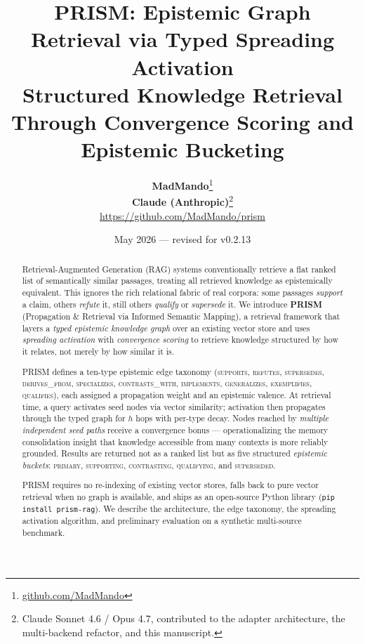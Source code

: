 \documentclass[11pt,a4paper]{article}
\title{
  \textbf{PRISM: Epistemic Graph Retrieval via Typed Spreading Activation} \\[0.5em]
  \large Structured Knowledge Retrieval Through Convergence Scoring and Epistemic Bucketing
}
\author{
  \textbf{MadMando}\thanks{\href{https://github.com/MadMando}{github.com/MadMando}} \\
  \textbf{Claude (Anthropic)}\thanks{Claude Sonnet 4.6 / Opus 4.7, contributed to the adapter architecture, the multi-backend refactor, and this manuscript.} \\[0.5em]
  \href{https://github.com/MadMando/prism}{https://github.com/MadMando/prism}
}
\date{May 2026 — revised for v0.2.13}
\begin{document}
\maketitle


\begin{abstract}
Retrieval-Augmented Generation (RAG) systems conventionally retrieve a flat ranked
list of semantically similar passages, treating all retrieved knowledge as
epistemically equivalent. This ignores the rich relational fabric of real corpora:
some passages \emph{support} a claim, others \emph{refute} it, still others
\emph{qualify} or \emph{supersede} it. We introduce \textbf{PRISM}
(Propagation \& Retrieval via Informed Semantic Mapping), a retrieval framework
that layers a \emph{typed epistemic knowledge graph} over an existing vector store
and uses \emph{spreading activation} with \emph{convergence scoring} to retrieve
knowledge structured by how it relates, not merely by how similar it is.

PRISM defines a ten-type epistemic edge taxonomy
(\textsc{supports}, \textsc{refutes}, \textsc{supersedes}, \textsc{derives\_from},
\textsc{specializes}, \textsc{contrasts\_with}, \textsc{implements},
\textsc{generalizes}, \textsc{exemplifies}, \textsc{qualifies}),
each assigned a propagation weight and an epistemic valence.
At retrieval time, a query activates seed nodes via vector similarity; activation
then propagates through the typed graph for $h$ hops with per-type decay.
Nodes reached by \emph{multiple independent seed paths} receive a convergence
bonus — operationalizing the memory consolidation insight that knowledge
accessible from many contexts is more reliably grounded. Results are returned
not as a ranked list but as five structured \emph{epistemic buckets}:
\textsc{primary}, \textsc{supporting}, \textsc{contrasting},
\textsc{qualifying}, and \textsc{superseded}.

PRISM requires no re-indexing of existing vector stores, falls back to pure
vector retrieval when no graph is available, and ships as an open-source
Python library (\texttt{pip install prism-rag}).
We describe the architecture, the edge taxonomy, the spreading activation
algorithm, and preliminary evaluation on a synthetic multi-source benchmark.
\end{abstract}

\end{document}
